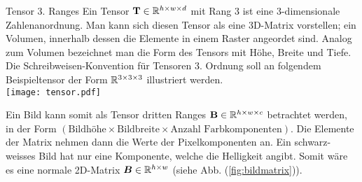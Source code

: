 \begin{defbox}{Tensor 3. Ranges}
  Ein Tensor $\mathbf{T} \in \mathbb{R}^{h \times w \times d}$ mit Rang 3 ist eine 3-dimensionale Zahlenanordnung. Man kann sich
  diesen Tensor als eine 3D-Matrix vorstellen; ein Volumen, innerhalb
  dessen die Elemente in einem Raster angeordet sind.
  Analog zum Volumen bezeichnet man die Form des Tensors mit Höhe, Breite und
  Tiefe.
  \para{}
  Die Schreibweisen-Konvention für Tensoren 3. Ordnung soll an folgendem
  Beispieltensor der Form $\mathbb{R}^{3 \times 3 \times 3}$ illustriert werden. \\
  \texttt{[image: tensor.pdf]}

\end{defbox}
\para{}
Ein Bild kann somit als Tensor dritten Ranges $\mathbf{B} \in \mathbb{R}^{h
  \times w \times c}$ betrachtet werden, in der Form $(\text{Bildhöhe} \times \text{Bildbreite}
\times \text{Anzahl Farbkomponenten})$.
Die Elemente der Matrix nehmen dann die Werte der Pixelkomponenten an.
Ein schwarz-weisses Bild hat nur eine Komponente, welche die Helligkeit angibt.
Somit wäre es eine normale 2D-Matrix $\bm{B} \in \mathbb{R}^{h \times w}$ (siehe
Abb. (\ref{fig:bildmatrix})).
\para{}
\cite{deeplearning.ai:cnn}
\cite{wiki:tensor}

